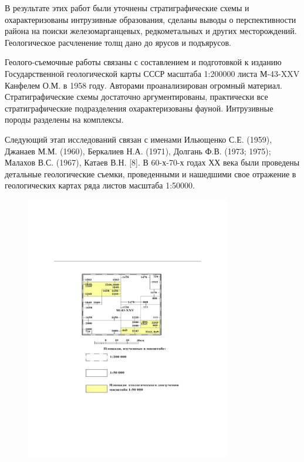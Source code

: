 В результате этих работ были уточнены стратиграфические схемы и
охарактеризованы интрузивные образования, сделаны выводы о
перспективности района на поиски железомарганцевых, редкометальных и
других месторождений. Геологическое расчленение толщ дано до ярусов и
подъярусов.

Геолого-съемочные работы связаны с составлением и подготовкой к изданию
Государственной геологической карты СССР масштаба 1:200000 листа
М-43-XXV Канфелем О.М. в 1958 году. Авторами проанализирован огромный
материал. Стратиграфические схемы достаточно аргументированы,
практически все стратиграфические подразделения охарактеризованы фауной.
Интрузивные породы разделены на комплексы.

Следующий этап исследований связан с именами Ильющенко С.Е. (1959),
Джанаев М.М. (1960), Беркалиев Н.А. (1971), Долгань Ф.В. (1973; 1975);
Малахов В.С. (1967), Катаев В.Н. {[}8{]}. В 60-х-70-х годах ХХ века были
проведены детальные геологические съемки, проведенными и нашедшими свое
отражение в геологических картах ряда листов масштаба 1:50000.

\begin{figure}[H]
	\centering
	\includegraphics[width=0.8\textwidth]{media/gorn2/image16}
	\caption*{}
\end{figure}


